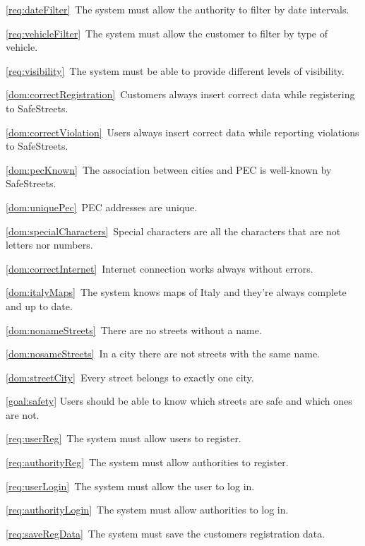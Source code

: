 \begin{description}
\begin{description}
\begin{description}
							\item \ref{req:dateFilter}\ The system must allow the authority to filter by date intervals.
							\item \ref{req:vehicleFilter}\ The system must allow the customer to filter by type of vehicle.
							\item \ref{req:visibility}\ The system must be able to provide different levels of visibility.
							\item \ref{dom:correctRegistration}\ Customers always insert correct data while registering to SafeStreets.
							\item \ref{dom:correctViolation}\ Users always insert correct data while reporting violations to SafeStreets.
							\item \ref{dom:pecKnown}\ The association between cities and PEC is well-known by SafeStreets.
							\item \ref{dom:uniquePec}\ PEC addresses are unique.
							\item \ref{dom:specialCharacters}\ Special characters are all the characters that are not letters nor numbers.
							\item \ref{dom:correctInternet}\ Internet connection works always without errors.
							\item \ref{dom:italyMaps}\ The system knows maps of Italy and they’re always complete and up to date.
							\item \ref{dom:nonameStreets}\ There are no streets without a name.
							\item \ref{dom:nosameStreets}\ In a city there are not streets with the same name.
							\item \ref{dom:streetCity}\ Every street belongs to exactly one city.
						\end{description}
				\end{description}
			\item \ref{goal:safety} Users should be able to know which streets are safe and which ones are not.
				\begin{description}
					\item \ref{req:userReg}\ The system must allow users to register.
					\item \ref{req:authorityReg}\ The system must allow authorities to register.
					\item \ref{req:userLogin}\ The system must allow the user to log in.
					\item \ref{req:authorityLogin}\ The system must allow authorities to log in.
					\item \ref{req:saveRegData}\ The system must save the customers registration data.

\end{description}
\end{description}
